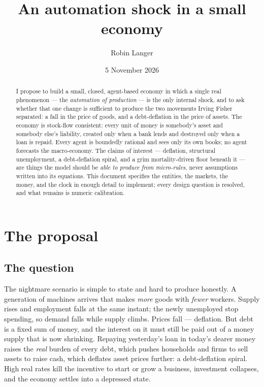 \documentclass[11pt]{article}
\title{\textbf{An automation shock in a small economy}}
\author{Robin Langer}
\date{5 November 2026}
\begin{document}
\maketitle

\begin{abstract}
\noindent
I propose to build a small, closed, agent-based economy in which a single
real phenomenon --- the \emph{automation of production} --- is the only
internal shock, and to ask whether that one change is sufficient to produce
the two movements Irving Fisher separated: a fall in the price of goods, and
a debt-deflation in the price of assets. The economy is stock-flow consistent:
every unit of money is somebody's asset and somebody else's liability, created
only when a bank lends and destroyed only when a loan is repaid. Every agent
is boundedly rational and sees only its own books; no agent forecasts the
macro-economy. The claims of interest --- deflation, structural unemployment,
a debt-deflation spiral, and a grim mortality-driven floor beneath it --- are
things the model should be \emph{able to produce from micro-rules}, never
assumptions written into its equations. This document specifies the entities,
the markets, the money, and the clock in enough detail to implement; every
design question is resolved, and what remains is numeric calibration.
\end{abstract}

{\small\tableofcontents}

\section{The proposal}

\subsection{The question}

The nightmare scenario is simple to state and hard to produce honestly. A
generation of machines arrives that makes \emph{more} goods with \emph{fewer}
workers. Supply rises and employment falls at the same instant; the newly
unemployed stop spending, so demand falls while supply climbs. Prices fall ---
deflation. But debt is a fixed sum of money, and the interest on it must still
be paid out of a money supply that is now shrinking. Repaying yesterday's loan
in today's dearer money raises the \emph{real} burden of every debt, which
pushes households and firms to sell assets to raise cash, which deflates asset
prices further: a debt-deflation spiral. High real rates kill the incentive to
start or grow a business, investment collapses, and the economy settles into a
depressed state.
\end{document}
